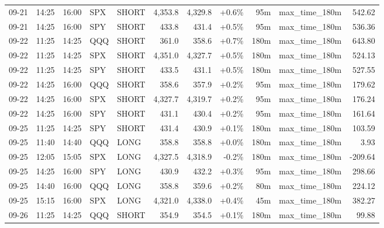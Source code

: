 \documentclass[11pt,a4paper,twoside]{article}
\begin{document}
\begin{center}
\begin{longtable}{>{\color{txtmain}}l l l l l r r r r >{\color{txtmain}}l r}
09-21 & 14:25 & 16:00 & SPX & SHORT & 4,353.8 & 4,329.8 & \textcolor{wingreen}{+0.6\%} & 95m & max\_time\_180m & \textcolor{wingreen}{542.62} \\
09-21 & 14:25 & 16:00 & SPY & SHORT & 433.8 & 431.4 & \textcolor{wingreen}{+0.5\%} & 95m & max\_time\_180m & \textcolor{wingreen}{536.36} \\
09-22 & 11:25 & 14:25 & QQQ & SHORT & 361.0 & 358.6 & \textcolor{wingreen}{+0.7\%} & 180m & max\_time\_180m & \textcolor{wingreen}{643.80} \\
09-22 & 11:25 & 14:25 & SPX & SHORT & 4,351.0 & 4,327.7 & \textcolor{wingreen}{+0.5\%} & 180m & max\_time\_180m & \textcolor{wingreen}{524.13} \\
09-22 & 11:25 & 14:25 & SPY & SHORT & 433.5 & 431.1 & \textcolor{wingreen}{+0.5\%} & 180m & max\_time\_180m & \textcolor{wingreen}{527.55} \\
09-22 & 14:25 & 16:00 & QQQ & SHORT & 358.6 & 357.9 & \textcolor{wingreen}{+0.2\%} & 95m & max\_time\_180m & \textcolor{wingreen}{179.62} \\
09-22 & 14:25 & 16:00 & SPX & SHORT & 4,327.7 & 4,319.7 & \textcolor{wingreen}{+0.2\%} & 95m & max\_time\_180m & \textcolor{wingreen}{176.24} \\
09-22 & 14:25 & 16:00 & SPY & SHORT & 431.1 & 430.4 & \textcolor{wingreen}{+0.2\%} & 95m & max\_time\_180m & \textcolor{wingreen}{161.64} \\
09-25 & 11:25 & 14:25 & SPY & SHORT & 431.4 & 430.9 & \textcolor{wingreen}{+0.1\%} & 180m & max\_time\_180m & \textcolor{wingreen}{103.59} \\
09-25 & 11:40 & 14:40 & QQQ & LONG & 358.8 & 358.8 & \textcolor{wingreen}{+0.0\%} & 180m & max\_time\_180m & \textcolor{wingreen}{3.93} \\
09-25 & 12:05 & 15:05 & SPX & LONG & 4,327.5 & 4,318.9 & \textcolor{lossred}{-0.2\%} & 180m & max\_time\_180m & \textcolor{lossred}{-209.64} \\
09-25 & 14:25 & 16:00 & SPY & LONG & 430.9 & 432.2 & \textcolor{wingreen}{+0.3\%} & 95m & max\_time\_180m & \textcolor{wingreen}{298.66} \\
09-25 & 14:40 & 16:00 & QQQ & LONG & 358.8 & 359.6 & \textcolor{wingreen}{+0.2\%} & 80m & max\_time\_180m & \textcolor{wingreen}{224.12} \\
09-25 & 15:15 & 16:00 & SPX & LONG & 4,321.0 & 4,338.0 & \textcolor{wingreen}{+0.4\%} & 45m & max\_time\_180m & \textcolor{wingreen}{382.27} \\
09-26 & 11:25 & 14:25 & QQQ & SHORT & 354.9 & 354.5 & \textcolor{wingreen}{+0.1\%} & 180m & max\_time\_180m & \textcolor{wingreen}{99.88} \\

\end{longtable}
\end{center}
\end{document}
